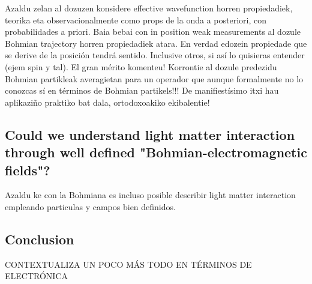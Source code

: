 \documentclass[11pt, a4paper]{article} %
\begin{document}
Azaldu zelan al dozuzen konsidere effective wavefunction horren propiedadiek, teorika eta observacionalmente como props de la onda a posteriori, con probabilidades a priori.
Baia bebai con in position weak measurements al dozule Bohmian trajectory horren propiedadiek atara. En verdad edozein propiedade que se derive de la posición tendrá sentido. Inclusive otros, si así lo quisieras entender (ejem spin y tal). El gran mérito komenteu! Korrontie al dozule predezidu Bohmian partikleak averagietan para un operador que aunque formalmente no lo conozcas sí en términos de Bohmian partikels!!! De manifiestísimo itxi hau aplikaziño praktiko bat dala, ortodoxoakiko ekibalentie!


\subsection*{Could we understand light matter interaction through well defined "Bohmian-electromagnetic fields"?}

Azaldu ke con la Bohmiana es incluso posible describir light matter interaction empleando particulas y campos bien definidos.

\subsection*{Conclusion}
CONTEXTUALIZA UN POCO MÁS TODO EN TÉRMINOS DE ELECTRÓNICA
\end{document}
